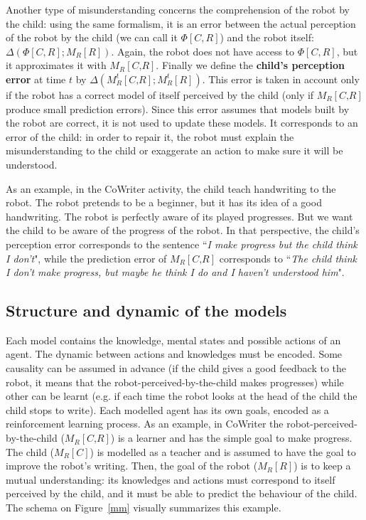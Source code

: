 \documentclass[10pt,a4paper]{article}
\begin{document}
Another type of misunderstanding concerns the comprehension of the robot by the child: using the same formalism, it is an error between the actual perception of the robot by the child (we can call it $\Phi[C,R]$) and the robot itself: $\Delta \left(\Phi[C,R] ; M_R\left[\textit{R}\right]\right)$. Again, the robot does not have access to $\Phi[C,R]$, but it approximates it with $ M_R\left[\textit{C,R}\right]$. Finally we define the \textbf{child's perception error} at time $t$ by $\Delta \left(M^t_R\left[\textit{C,R}\right] ; M^t_R\left[\textit{R}\right]\right)$. This error is taken in account only if the robot has a correct model of itself perceived by the child (only if $M_R\left[\textit{C,R}\right]$ produce small prediction errors). Since this error assumes that models built by the robot are correct, it is not used to update these models. It corresponds to an error of the child: in order to repair it, the robot must explain the misunderstanding to the child or exaggerate an action to make sure it will be understood.

As an example, in the CoWriter activity, the child teach handwriting to the robot. The robot pretends to be a beginner, but it has its idea of a good handwriting. The robot is perfectly aware of its played progresses. But we want the child to be aware of the progress of the robot. In that perspective, the child's perception error corresponds to the sentence ``\textit{I make progress but the child think I don't}", while the prediction error of $M_R\left[\textit{C,R}\right]$ corresponds to ``\textit{The child think I don't make progress, but maybe he think I do and I haven't understood him}".  

\subsection{Structure and dynamic of the models}
Each model contains the knowledge, mental states and possible actions of an agent. The dynamic between actions and knowledges must be encoded. Some causality can be assumed in advance (if the child gives a good feedback to the robot, it means that the robot-perceived-by-the-child makes progresses) while other can be learnt (e.g. if each time the robot looks at the head of the child the child stops to write). Each modelled agent has its own goals, encoded as a reinforcement learning process. As an example, in CoWriter the robot-perceived-by-the-child ($ M_R\left[\textit{C,R}\right]$) is a learner and has the simple goal to make progress. The child ($ M_R\left[\textit{C}\right]$) is modelled as a teacher and is assumed to have the goal to improve the robot's writing. Then, the goal of the robot ($ M_R\left[\textit{R}\right]$) is to keep a mutual understanding: its knowledges and actions must correspond to itself perceived by the child, and it must be able to predict the behaviour of the child. The schema on Figure~\ref{mm} visually summarizes this example.
\end{document}
